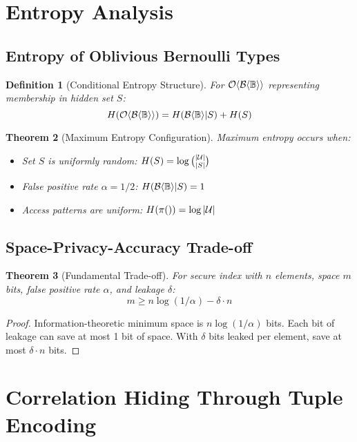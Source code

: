 \documentclass[11pt,final]{article}
\newcommand{\BernBool}{\mathcal{B}\langle \Bool \rangle}
\newcommand{\fprate}{\alpha}
\newtheorem{theorem}{Theorem}[section]
\newtheorem{definition}[theorem]{Definition}
\begin{document}
\section{Entropy Analysis}

\subsection{Entropy of Oblivious Bernoulli Types}

\begin{definition}[Conditional Entropy Structure]
For $\Obv{\BernBool}$ representing membership in hidden set $S$:
\begin{equation}
\Info{\Obv{\BernBool}} = \Info{\BernBool | S} + \Info{S}
\end{equation}
\end{definition}

\begin{theorem}[Maximum Entropy Configuration]
Maximum entropy occurs when:
\begin{itemize}
    \item Set $S$ is uniformly random: $H(S) = \log \binom{|\mathcal{U}|}{|S|}$
    \item False positive rate $\fprate = 1/2$: $\Info{\BernBool|S} = 1$
    \item Access patterns are uniform: $H(\pi()) = \log |\mathcal{U}|$
\end{itemize}
\end{theorem}

\subsection{Space-Privacy-Accuracy Trade-off}

\begin{theorem}[Fundamental Trade-off]
For secure index with $n$ elements, space $m$ bits, false positive rate $\fprate$, and leakage $\delta$:
\begin{equation}
m \geq n \log(1/\fprate) - \delta \cdot n
\end{equation}
\end{theorem}

\begin{proof}
Information-theoretic minimum space is $n\log(1/\fprate)$ bits.
Each bit of leakage can save at most 1 bit of space.
With $\delta$ bits leaked per element, save at most $\delta \cdot n$ bits.
\end{proof}

\section{Correlation Hiding Through Tuple Encoding}
\end{document}
